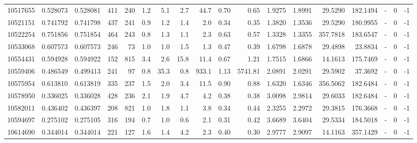 \begin{tabular}{rrrrrrrrrrrrrrrlrr}
  10517655 & 0.528073 &   0.528081 &  411 &  240 &      1.2 &      5.1 &     2.7 &     44.7 &       0.70 &        0.65 &  1.9275 &  1.8991 &   29.5290 &  182.1494 &             - &        0 &         -1 \\
  10521151 & 0.741792 &   0.741798 &  437 &  241 &      0.9 &      1.2 &     1.4 &      2.0 &       0.34 &        0.35 &  1.3820 &  1.3536 &   29.5290 &  180.9955 &             - &        0 &         -1 \\
  10522254 & 0.751856 &   0.751854 &  464 &  243 &      0.8 &      1.3 &     1.1 &      2.3 &       0.63 &        0.57 &  1.3328 &  1.3355 &  357.7818 &  183.6547 &             - &        0 &         -1 \\
  10533068 & 0.607573 &   0.607573 &  246 &   73 &      1.0 &      1.0 &     1.5 &      1.3 &       0.47 &        0.39 &  1.6798 &  1.6878 &   29.4898 &   23.8834 &             - &        0 &         -1 \\
  10554431 & 0.594928 &   0.594922 &  152 &  815 &      3.4 &      2.6 &    15.8 &     11.4 &       0.67 &        1.21 &  1.7515 &  1.6866 &   14.1613 &  175.7469 &             - &        0 &         -1 \\
  10559406 & 0.486549 &   0.499413 &  241 &   97 &      0.8 &     35.3 &     0.8 &    933.1 &       1.13 &     5741.81 &  2.0891 &  2.0291 &   29.5902 &   37.3692 &             - &        0 &         -1 \\
  10575954 & 0.613810 &   0.613819 &  335 &  237 &      1.5 &      2.0 &     3.4 &     11.5 &       0.90 &        0.88 &  1.6320 &  1.6346 &  356.5062 &  182.6484 &             - &        0 &         -1 \\
  10578950 & 0.336025 &   0.336028 &  428 &  236 &      2.1 &      1.9 &     4.7 &      4.2 &       0.38 &        0.38 &  3.0098 &  2.9814 &   29.6033 &  182.6484 &             - &        0 &         -1 \\
  10582011 & 0.436402 &   0.436397 &  208 &  821 &      1.0 &      1.8 &     1.1 &      3.8 &       0.34 &        0.44 &  2.3255 &  2.2972 &   29.3815 &  176.3668 &             - &        0 &         -1 \\
  10594697 & 0.275102 &   0.275105 &  316 &  194 &      0.7 &      1.0 &     0.6 &      2.1 &       0.31 &        0.42 &  3.6689 &  3.6404 &   29.5334 &  184.5018 &             - &        0 &         -1 \\
  10614690 & 0.344014 &   0.344014 &  221 &  127 &      1.6 &      1.4 &     4.2 &      2.3 &       0.40 &        0.30 &  2.9777 &  2.9097 &   14.1163 &  357.1429 &             - &        0 &         -1 \\

\end{tabular}
